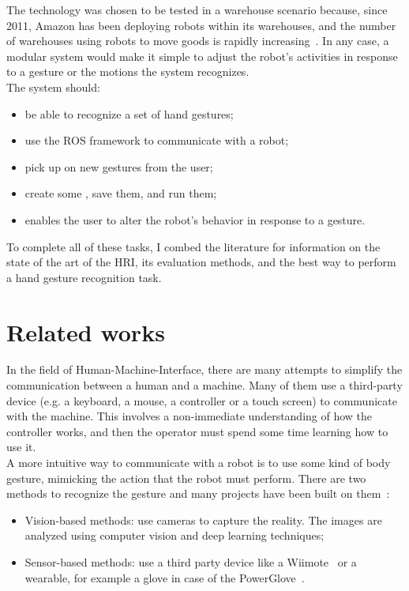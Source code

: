 \documentclass[../thesis.tex]{subfiles}
\begin{document}
The technology was chosen to be tested in a warehouse scenario because, since 2011, Amazon has been deploying robots within its warehouses, and the number of warehouses using robots to move goods is rapidly increasing~\cite{paper:bogue2016}. In any case, a modular system would make it simple to adjust the robot's activities in response to a gesture or the motions the system recognizes.\\
The system should:
\begin{itemize}
    \item be able to recognize a set of hand gestures;
    \item use the \acrshort{ROS} framework to communicate with a robot;
    \item pick up on new gestures from the user;
    \item create some , save them, and run them;
    \item enables the user to alter the robot's behavior in response to a gesture.
\end{itemize}
To complete all of these tasks, I combed the literature for information on the state of the art of the \acrshort{HRI}, its evaluation methods, and the best way to perform a hand gesture recognition task.

\section{Related works}
In the field of Human-Machine-Interface, there are many attempts to simplify the communication between a human and a machine. Many of them use a third-party device (e.g. a keyboard, a mouse, a controller or a touch screen) to communicate with the machine. This involves a non-immediate understanding of how the controller works, and then the operator must spend some time learning how to use it.\\

A more intuitive way to communicate with a robot is to use some kind of body gesture, mimicking the action that the robot must perform. There are two methods to recognize the gesture and many projects have been built on them~\cite{paper:design_and_evaluate_hand_gesture}:
\begin{itemize}
    \item Vision-based methods: use cameras to capture the reality. The images are analyzed using computer vision and deep learning techniques;
    \item Sensor-based methods: use a third party device like a Wiimote~\cite{paper:guo2008exploring} or a wearable, for example a glove in case of the PowerGlove~\cite{paper:kessler1995evaluation}.
\end{itemize}
\end{document}
